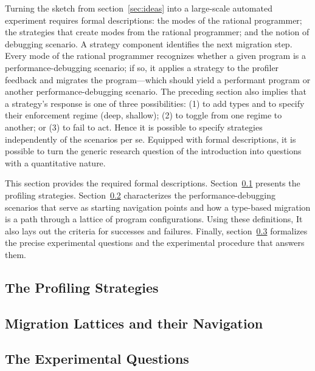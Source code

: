 
Turning the sketch from section~\ref{sec:ideas} into a large-scale automated
experiment requires formal descriptions: the modes of the rational programmer;
the strategies that create modes from the rational programmer; and the notion of
debugging scenario. A strategy component identifies the next migration step.
Every mode of the rational programmer recognizes whether a given program is a
performance-debugging scenario; if so, it applies a strategy to the profiler
feedback and migrates the program---which should yield a performant program or
another performance-debugging scenario.  The preceding section also implies that
a strategy's response is one of three possibilities: (1) to add types and to
specify their enforcement regime (deep, shallow); (2) to toggle from one regime
to another; or (3) to fail to act. Hence it is possible to specify strategies
independently of the scenarios per se. Equipped with formal descriptions, it is
possible to turn the generic research question of the introduction into
questions with a quantitative nature.

This section provides the required formal descriptions.
Section~\ref{subsec:strategies} presents the profiling strategies.
Section~\ref{subsec:lattice} characterizes the performance-debugging scenarios
that serve as starting navigation points and how a type-based migration is a
path through a lattice of program configurations. Using these definitions, It
also lays out the criteria for successes and failures. Finally,
section~\ref{subsec:questions} formalizes the precise experimental questions and
the experimental procedure that answers them.


\def\exp#1#2{\subsection{#2} \label{subsec:#1} }

\exp{strategies}{The Profiling Strategies}
\exp{lattice}{Migration Lattices and their Navigation}
\exp{questions}{The Experimental Questions}
